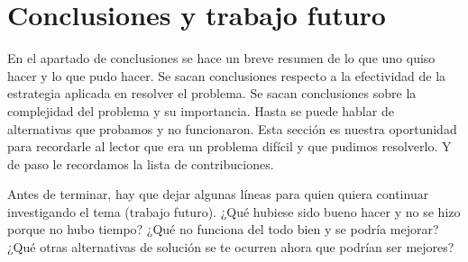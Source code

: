 \chapter{Conclusiones y trabajo futuro}

En el apartado de conclusiones se hace un breve resumen de lo que uno quiso hacer y lo que pudo hacer. Se sacan conclusiones respecto a la efectividad de la estrategia aplicada en resolver el problema. Se sacan conclusiones sobre la complejidad del problema y su importancia. Hasta se puede hablar de alternativas que probamos y no funcionaron. 
Esta sección es nuestra oportunidad para recordarle al lector que era un problema difícil y que pudimos resolverlo. Y de paso le recordamos la lista de contribuciones.  

Antes de terminar, hay que dejar algunas líneas para quien quiera continuar investigando el tema (trabajo futuro). ¿Qué hubiese sido bueno hacer y no se hizo porque no hubo tiempo? ¿Qué no funciona del todo bien y se podría mejorar? ¿Qué otras alternativas de solución se te ocurren ahora que podrían ser mejores? 



